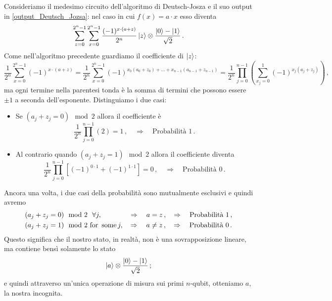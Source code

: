 \noindent Consideriamo il medesimo circuito dell'algoritmo di Deutsch-Josza e il suo output in \eqref{output_Deutsch_Jozsa}: nel caso in cui $f(x) = a \cdot x$ esso diventa 
\begin{equation*}
    \sum_{z=0}^{2^n-1}\sum_{x=0}^{2^n-1}\frac{(-1)^{x\cdot (a+z)}}{2^n}\ket z \otimes \frac{\ket 0 - \ket 1}{\sqrt 2} \, .
\end{equation*}
Come nell'algoritmo precedente guardiamo il coefficiente di $\ket{z}$:
\begin{equation*}
        \frac{1}{2^n} \sum_{x=0}^{2^n-1}(-1)^{x\cdot (a+z)} = \frac{1}{2^n} \sum_{x=0}^{2^n-1}(-1)^{x_0(a_0+z_0) + \ldots + x_{n-1}(a_{n-1}+z_{n-1})} = \frac{1}{2^n} \prod_{j=0}^{n-1} \left( \sum_{x_j=0}^{1}(-1)^{x_j(a_j+z_j)} \right) \, ,
\end{equation*}
ma ogni termine nella parentesi tonda è la somma di termini che possono essere $\pm 1$ a seconda dell'esponente. Distinguiamo i due casi:
\begin{itemize}
    \item Se $(a_j+z_j=0)\mod2 $ allora il coefficiente è 
    \begin{equation*}
        \frac{1}{2^n} \prod_{j=0}^{n-1}(2) = 1 \, , \quad \Rightarrow \quad \text{Probabilità } 1 \, .
    \end{equation*}
    \item Al contrario quando $(a_j+z_j=1)\mod2$ allora il coefficiente diventa 
    \begin{equation*}
        \frac{1}{2^n} \prod_{j=0}^{n-1} \left[ (-1)^{0\cdot 1} + (-1)^{1 \cdot 1} \right] = 0 \, , \quad \Rightarrow \quad \text{Probabilità } 0 \, .
    \end{equation*}
\end{itemize}
Ancora una volta, i due casi della probabilità sono mutualmente esclusivi e quindi avremo
\begin{align*}
    &(a_j+z_j=0)\mod2 \, \, \,\, \forall j, \qquad\qquad\,  \Rightarrow \quad a = z \, , \quad \Rightarrow \quad \text{Probabilità } 1 \, , \\
    &(a_j+z_j=1)\mod2 \,\,  \text{for\, some}\, j, \quad \Rightarrow \quad a \neq z \, , \quad \Rightarrow \quad \text{Probabilità } 0 \, .
\end{align*}
Questo significa che il nostro stato, in realtà, non è una sovrapposizione lineare, ma contiene bensì solamente lo stato
\begin{equation*}
    \ket a \otimes \frac{\ket 0 - \ket 1}{\sqrt 2} \, ;
\end{equation*}
e quindi attraverso un'unica operazione di misura sui primi $n$-qubit, otteniamo $a$, la nostra incognita.